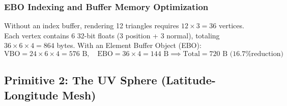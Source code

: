 \documentclass[11pt,a4paper]{article}
\begin{document}
\subsubsection{EBO Indexing and Buffer Memory Optimization}
Without an index buffer, rendering 12 triangles requires $12 \times 3 = 36$ vertices. Each vertex contains 6 32-bit floats (3 position + 3 normal), totaling $36 \times 6 \times 4 = 864$ bytes. With an Element Buffer Object (EBO):
\begin{equation}
    \text{VBO} = 24 \times 6 \times 4 = 576\text{ B}, \quad \text{EBO} = 36 \times 4 = 144\text{ B} \implies \text{Total} = 720\text{ B (16.7\% reduction)}
\end{equation}




\subsection{Primitive 2: The UV Sphere (Latitude-Longitude Mesh)}
\end{document}
